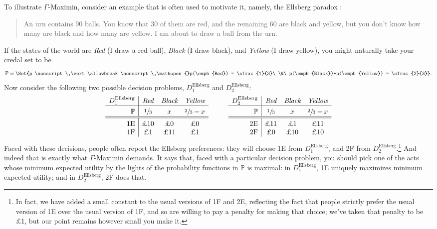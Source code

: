 \documentclass[a4paper,final]{article}
\newcommand\Tstrut{\rule{0pt}{2.6ex}}       %
\newcommand\Bstrut{\rule[-0.9ex]{0pt}{0pt}} %
\renewcommand\P{\mathbb{P}} %
\newcommand{\IP}{\P}
\newcommand\SetDelimiter[1][]{
	\nonscript\,#1\vert \allowbreak \nonscript\,\mathopen{}}
\providecommand\given{\SetDelimiter}
\newenvironment{CCM rewritten}
{\begingroup\color{blue}} %
{\endgroup}              %
\begin{document}

To illustrate $\Gamma$-Maximin, consider an example that is often used to motivate it, namely, the Ellsberg paradox \citep{ellsberg1961rasa}:

\label{sect:Ellsberg}
\begin{quote}
 An urn contains 90 balls. You know that 30 of them are red, and the remaining 60 are black and yellow, but you don’t know how many are black and how many are yellow. I am about to draw a ball from the urn.
\end{quote}
If the states of the world are \emph{Red} (I draw a red ball), \emph{Black} (I draw black), and \emph{Yellow} (I draw yellow), you might naturally take your credal set to be $$\IP = \Set{p \given p(\emph{Red}) = \sfrac{1}{3}\ \&\ p(\emph{Black})+p(\emph{Yellow}) = \sfrac{2}{3}}.$$
Now consider the following two possible decision problems, $D^{\mathrm{Ellsberg}}_1$ and $D^{\mathrm{Ellsberg}}_2$:
$$
\begin{array}{r|ccc}
D^{\mathrm{Ellsberg}}_1 & \emph{Red} & \emph{Black} &\emph{Yellow} \Bstrut \\\hline \Tstrut\IP & \sfrac{1}{3} & x&\sfrac{2}{3}-x %
\Bstrut \\\hline \hline\Tstrut 
\text{1E} & \text{\pounds 10} & \text{\pounds 0}  & \text{\pounds 0} \\
\text{1F} & \text{\pounds 1} & \text{\pounds 11}  & \text{\pounds 1} 
\end{array}
\hspace{10mm}
\begin{array}{r|ccc}
D^{\mathrm{Ellsberg}}_2 & \emph{Red} & \emph{Black} &\emph{Yellow} \Bstrut \\\hline \Tstrut\IP & \sfrac{1}{3} &x&\sfrac{2}{3}-x %
\Bstrut \\\hline \hline\Tstrut 
\text{2E} & \text{\pounds 11} & \text{\pounds 1}  & \text{\pounds 11} \\
\text{2F} & \text{\pounds 0} & \text{\pounds 10}  & \text{\pounds 10} 
\end{array}
$$
Faced with these decisions, people often report the Ellsberg preferences: they will choose 1E from $D^{\mathrm{Ellsberg}}_1$, and 2F from $D^{\mathrm{Ellsberg}}_2$.\footnote{In fact, we have added a small constant to the usual versions of 1F and 2E, reflecting the fact that people strictly prefer the usual version of 1E over the usual version of 1F, and so are willing to pay a penalty for making that choice; we've taken that penalty to be \pounds 1, but our point remains however small you make it.} And indeed that is exactly what $\Gamma$-Maximin demands. It says that, faced with a particular decision problem, you should pick one of the acts whose minimum expected utility by the lights of the probability functions in $\IP$ is maximal: in $D^{\mathrm{Ellsberg}}_1$, 1E uniquely maximizes minimum expected utility; and in $D^{\mathrm{Ellsberg}}_2$, 2F does that.
\end{document}
